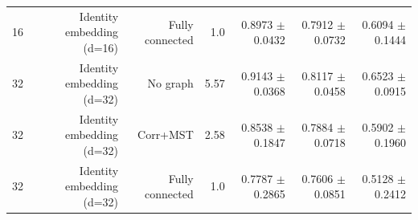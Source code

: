 \begin{table}[t]
\begin{tabular}{lrrrrrr}
16 & Identity embedding (d=16) & Fully connected & 1.0 & 0.8973 $\pm$ 0.0432 & 0.7912 $\pm$ 0.0732 & 0.6094 $\pm$ 0.1444 \\
32 & Identity embedding (d=32) & No graph & 5.57 & 0.9143 $\pm$ 0.0368 & 0.8117 $\pm$ 0.0458 & 0.6523 $\pm$ 0.0915 \\
32 & Identity embedding (d=32) & Corr+MST & 2.58 & 0.8538 $\pm$ 0.1847 & 0.7884 $\pm$ 0.0718 & 0.5902 $\pm$ 0.1960 \\
32 & Identity embedding (d=32) & Fully connected & 1.0 & 0.7787 $\pm$ 0.2865 & 0.7606 $\pm$ 0.0851 & 0.5128 $\pm$ 0.2412 \\
\bottomrule
\end{tabular}
\end{table}
